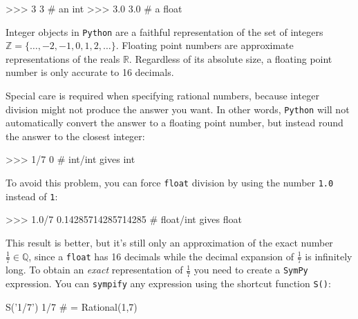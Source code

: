\small
\begin{verbatimtab}
>>> 3
3                             # an int
>>> 3.0
3.0                           # a float 
\end{verbatimtab}
\normalsize
Integer objects in \texttt{Python} are a faithful representation of the set of integers $\mathbb{Z}=\{\ldots,-2,-1,0,1,2,\ldots\}$.
Floating point numbers are approximate representations of the reals $\mathbb{R}$.
Regardless of its absolute size, 
a floating point number is only accurate to 16 decimals.



 
Special care is required when specifying rational numbers,
because integer division might not produce the answer you want.
In other words, 
\texttt{Python} will not automatically convert the answer to a floating point number,
but instead round the answer to the closest integer:
\small
\begin{verbatimtab}
>>> 1/7
0                             # int/int gives int 
\end{verbatimtab}
\normalsize

\noindent
To avoid this problem, you can force \texttt{float} division by using the number \texttt{1.0} instead of \texttt{1}:
\small
\begin{verbatimtab}
>>> 1.0/7
0.14285714285714285           # float/int gives float
\end{verbatimtab}
\normalsize

\noindent
This result is better, but it's still only an approximation of the exact number $\frac{1}{7} \in \mathbb{Q}$, 					
since a \texttt{float} has 16 decimals while the decimal expansion of $\frac{1}{7}$ is infinitely long. 
To obtain an \emph{exact} representation of $\frac{1}{7}$ you need to create a \texttt{SymPy} expression.
You can \texttt{sympify} any expression using the shortcut function \texttt{S()}:
\small
\begin{verbatimtab}
S('1/7')
1/7                           # = Rational(1,7)
\end{verbatimtab}
\normalsize

